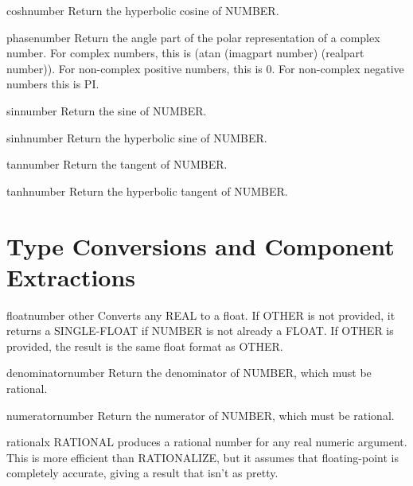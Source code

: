 \documentclass[10pt,english]{book}
\begin{document}
\begin{function}{cosh}{number}
  Return the hyperbolic cosine of NUMBER.
\end{function}

\begin{function}{phase}{number}
  Return the angle part of the polar representation of a complex number.
  For complex numbers, this is (atan (imagpart number) (realpart number)).
  For non-complex positive numbers, this is 0. For non-complex negative
  numbers this is PI.
\end{function}

\begin{function}{sin}{number}
  Return the sine of NUMBER.
\end{function}

\begin{function}{sinh}{number}
  Return the hyperbolic sine of NUMBER.
\end{function}

\begin{function}{tan}{number}
  Return the tangent of NUMBER.
\end{function}

\begin{function}{tanh}{number}
  Return the hyperbolic tangent of NUMBER.
\end{function}

\section{Type Conversions and Component Extractions}
\label{sec:type-conv-comp}

\begin{function}{float}{number \op other}
  Converts any REAL to a float. If OTHER is not provided, it returns a
  SINGLE-FLOAT if NUMBER is not already a FLOAT. If OTHER is provided, the
  result is the same float format as OTHER.
\end{function}

\begin{function}{denominator}{number}
  Return the denominator of NUMBER, which must be rational.
\end{function}

\begin{function}{numerator}{number}
  Return the numerator of NUMBER, which must be rational.
\end{function}

\begin{function}{rational}{x}
  RATIONAL produces a rational number for any real numeric argument. This is
  more efficient than RATIONALIZE, but it assumes that floating-point is
  completely accurate, giving a result that isn't as pretty.
\end{function}
\end{document}
